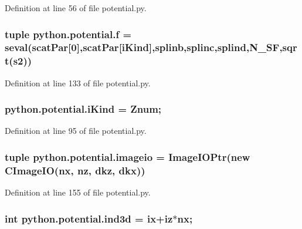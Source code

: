 Definition at line 56 of file potential.\-py.

\hypertarget{namespacepython_1_1potential_af887b24c78c0630197f05f84f19de90c}{
\subsubsection[{f}]{\setlength{\rightskip}{0pt plus 5cm}tuple python.\-potential.\-f = seval(scat\-Par\mbox{[}0\mbox{]},scat\-Par\mbox{[}{\bf i\-Kind}\mbox{]},{\bf splinb},{\bf splinc},{\bf splind},{\bf N\-\_\-\-S\-F},sqrt({\bf s2}))}}\label{namespacepython_1_1potential_af887b24c78c0630197f05f84f19de90c}


Definition at line 133 of file potential.\-py.

\hypertarget{namespacepython_1_1potential_abba14ca4095be69395d3515d794c0363}{
\subsubsection[{i\-Kind}]{\setlength{\rightskip}{0pt plus 5cm}python.\-potential.\-i\-Kind = Znum;}}\label{namespacepython_1_1potential_abba14ca4095be69395d3515d794c0363}


Definition at line 95 of file potential.\-py.

\hypertarget{namespacepython_1_1potential_a835c7bc4f088e9c2ac8d9fa058fcc581}{
\subsubsection[{imageio}]{\setlength{\rightskip}{0pt plus 5cm}tuple python.\-potential.\-imageio = Image\-I\-O\-Ptr(new C\-Image\-I\-O({\bf nx}, {\bf nz}, {\bf dkz}, {\bf dkx}))}}\label{namespacepython_1_1potential_a835c7bc4f088e9c2ac8d9fa058fcc581}


Definition at line 155 of file potential.\-py.

\hypertarget{namespacepython_1_1potential_a1c60bfc856f457826271451bc0792b76}{
\subsubsection[{ind3d}]{\setlength{\rightskip}{0pt plus 5cm}int python.\-potential.\-ind3d = {\bf ix}+iz$\ast${\bf nx};}}\label{namespacepython_1_1potential_a1c60bfc856f457826271451bc0792b76}


